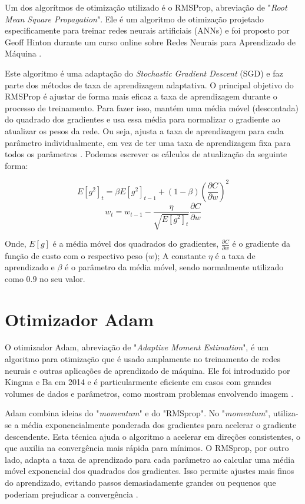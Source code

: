 Um dos algorítmos de otimização utilizado é o RMSProp, abreviação de "\textit{Root Mean Square Propagation}". Ele é um algoritmo de otimização projetado especificamente para treinar redes neurais artificiais (ANNs) e foi proposto por Geoff Hinton durante um curso online sobre Redes Neurais para Aprendizado de Máquina \cite{elshamy2023improving}.

Este algoritmo é uma adaptação do \textit{Stochastic Gradient Descent} (SGD) e faz parte dos métodos de taxa de aprendizagem adaptativa. O principal objetivo do RMSProp é ajustar de forma mais eficaz a taxa de aprendizagem durante o processo de treinamento. Para fazer isso, mantém uma média móvel (descontada) do quadrado dos gradientes e usa essa média para normalizar o gradiente ao atualizar os pesos da rede. Ou seja, ajusta a taxa de aprendizagem para cada parâmetro individualmente, em vez de ter uma taxa de aprendizagem fixa para todos os parâmetros \cite{elshamy2023improving}. Podemos escrever os cálculos de atualização da seguinte forma:

$$
E [g^2]_t = \beta E[g^2]_{t-1} + (1 - \beta)(\frac{\partial C}{\partial w})^2 
$$
$$
w_t = w_{t-1} - \frac{\eta}{\sqrt{E[g^2]_t}}\frac{\partial C}{ \partial w}
$$


Onde, $E[g]$ é a média móvel dos quadrados do gradientes, $\frac{\partial C}{\partial w}$ é o gradiente da função de custo com o respectivo peso ($w$); A constante $\eta$ é a taxa de aprendizado e $\beta$ é o parâmetro da média móvel, sendo normalmente utilizado como $0.9$ no seu valor.


\section{Otimizador Adam}

O otimizador Adam, abreviação de "\textit{Adaptive Moment Estimation}", é um algoritmo para otimização que é usado amplamente no treinamento de redes neurais e outras aplicações de aprendizado de máquina. Ele foi introduzido por Kingma e Ba em 2014 e é particularmente eficiente em casos com grandes volumes de dados e parâmetros, como mostram problemas envolvendo imagem \cite{Watt2016MachineLearning}.

Adam combina ideias do "\textit{momentum}" e do "RMSprop". No "\textit{momentum}", utiliza-se a média exponencialmente ponderada dos gradientes para acelerar o gradiente descendente. Esta técnica ajuda o algoritmo a acelerar em direções consistentes, o que auxilia na convergência mais rápida para mínimos. O RMSprop, por outro lado, adapta a taxa de aprendizado para cada parâmetro ao calcular uma média móvel exponencial dos quadrados dos gradientes. Isso permite ajustes mais finos do aprendizado, evitando passos demasiadamente grandes ou pequenos que poderiam prejudicar a convergência \cite{gess2023convergence}.

